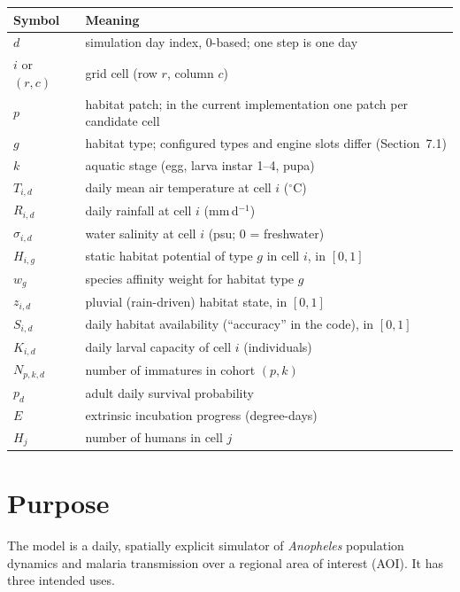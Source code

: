 \documentclass[11pt,a4paper]{article}
\begin{document}
\begin{center}
\small
\begin{tabular}{@{}ll@{}}
\toprule
Symbol & Meaning \\
\midrule
$d$ & simulation day index, 0-based; one step is one day \\
$i$ or $(r,c)$ & grid cell (row $r$, column $c$) \\
$p$ & habitat patch; in the current implementation one patch per candidate cell \\
$g$ & habitat type; configured types and engine slots differ (Section~7.1) \\
$k$ & aquatic stage (egg, larva instar 1--4, pupa) \\
$T_{i,d}$ & daily mean air temperature at cell $i$ ($^\circ$C) \\
$R_{i,d}$ & daily rainfall at cell $i$ (mm\,d$^{-1}$) \\
$\sigma_{i,d}$ & water salinity at cell $i$ (psu; 0 = freshwater) \\
$H_{i,g}$ & static habitat potential of type $g$ in cell $i$, in $[0,1]$ \\
$w_g$ & species affinity weight for habitat type $g$ \\
$z_{i,d}$ & pluvial (rain-driven) habitat state, in $[0,1]$ \\
$S_{i,d}$ & daily habitat availability (``accuracy'' in the code), in $[0,1]$ \\
$K_{i,d}$ & daily larval capacity of cell $i$ (individuals) \\
$N_{p,k,d}$ & number of immatures in cohort $(p,k)$ \\
$p_d$ & adult daily survival probability \\
$E$ & extrinsic incubation progress (degree-days) \\
$H_j$ & number of humans in cell $j$ \\
\bottomrule
\end{tabular}
\end{center}

\section{Purpose}

The model is a daily, spatially explicit simulator of \emph{Anopheles}
population dynamics and malaria transmission over a regional
area of interest (AOI). It has three intended uses.
\end{document}
